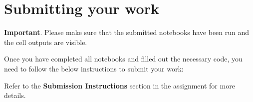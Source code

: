 \section{Submitting your work}

\textbf{Important}. Please make sure that the submitted notebooks have been run and the cell outputs are visible.

Once you have completed all notebooks and filled out the necessary code, you need to follow the below instructions to submit your work:

Refer to the \textbf{Submission Instructions} section in the assignment for more details.